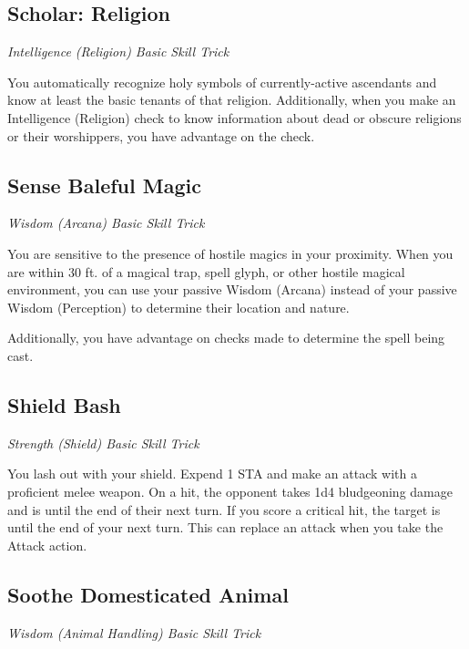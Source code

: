 \subsection{Scholar: Religion}\label{st:scholar-religion}

\textit{Intelligence (Religion) Basic Skill Trick}

You automatically recognize holy symbols of currently-active ascendants and know at least the basic tenants of that religion. Additionally, when you make an Intelligence (Religion) check to know information about dead or obscure religions or their worshippers, you have advantage on the check.

\subsection{Sense Baleful Magic}\label{st:sense-baleful-magic}

\textit{Wisdom (Arcana) Basic Skill Trick}

You are sensitive to the presence of hostile magics in your proximity. When you are within 30 ft. of a magical trap, spell glyph, or other hostile magical environment, you can use your passive Wisdom (Arcana) instead of your passive Wisdom (Perception) to determine their location and nature.

Additionally, you have advantage on checks made to determine the spell being cast.

\subsection{Shield Bash}

\textit{Strength (Shield) Basic Skill Trick}

You lash out with your shield. Expend 1 STA and make an attack with a proficient melee weapon. On a hit, the opponent takes 1d4 bludgeoning damage and is  until the end of their next turn. If you score a critical hit, the target is  until the end of your next turn. This can replace an attack when you take the Attack action.

\subsection{Soothe Domesticated Animal}\label{st:soothe-domesticated-animal}

\textit{Wisdom (Animal Handling) Basic Skill Trick}

